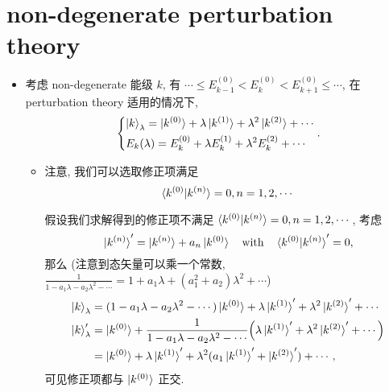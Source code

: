 \section{non-degenerate perturbation theory}
\begin{itemize}
	\item 考虑 non-degenerate 能级 $k$, 有 $\cdots \leq E_{k - 1}^{(0)} < E_k^{(0)} < E_{k + 1}^{(0)} \leq \cdots$, 在 perturbation theory 适用的情况下,
	\begin{equation} \label{perturbation theory in QM.1.1}
		\begin{dcases}
			\ket{k}_\lambda = \ket{k^{(0)}} + \lambda \ket{k^{(1)}} + \lambda^2 \ket{k^{(2)}} + \cdots \\
			E_k(\lambda) = E_k^{(0)} + \lambda E_k^{(1)} + \lambda^2 E_k^{(2)} + \cdots
		\end{dcases}.
	\end{equation}
	\begin{itemize}
			\item 注意, 我们可以选取修正项满足
			\begin{equation} \label{perturbation theory in QM.1.2}
				\braket{k^{(0)} | k^{(n)}} = 0, n = 1, 2, \cdots
			\end{equation}
			
			\begin{tcolorbox}[title=proof:]
				假设我们求解得到的修正项不满足 $\braket{k^{(0)} | k^{(n)}} = 0, n = 1, 2, \cdots$, 考虑
				\begin{equation}
					\ket{k^{(n)}}' = \ket{k^{(n)}} + a_n \ket{k^{(0)}} \quad \text{with} \quad \braket{k^{(0)} | k^{(n)}}' = 0,
				\end{equation}
				那么 (注意到态矢量可以乘一个常数, $\frac{1}{1 - a_1 \lambda - a_2 \lambda^2 - \cdots} = 1 + a_1 \lambda + (a_1^2 + a_2) \lambda^2 + \cdots$)
				\begin{align}
					\ket{k}_\lambda &= (1 - a_1 \lambda - a_2 \lambda^2 - \cdots) \ket{k^{(0)}} + \lambda \ket{k^{(1)}}' + \lambda^2 \ket{k^{(2)}}' + \cdots \notag \\
					\ket{k}'_\lambda &= \ket{k^{(0)}} + \frac{1}{1 - a_1 \lambda - a_2 \lambda^2 - \cdots} \Big( \lambda \ket{k^{(1)}}' + \lambda^2 \ket{k^{(2)}}' + \cdots \Big) \notag \\
					&= \ket{k^{(0)}} + \lambda \ket{k^{(1)}}' + \lambda^2 (a_1 \ket{k^{(1)}}' + \ket{k^{(2)}}') + \cdots,
				\end{align}
				可见修正项都与 $\ket{k^{(0)}}$ 正交.
			\end{tcolorbox}
			

\end{itemize}
\end{itemize}
